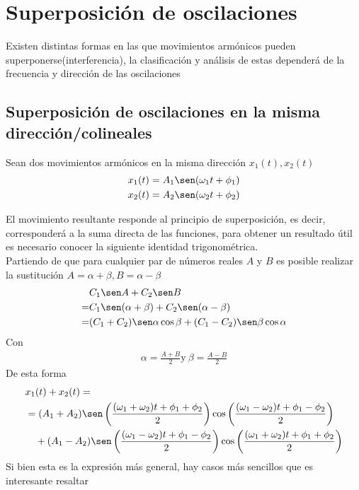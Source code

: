 \documentclass[12pt]{article}
\begin{document}
\section{Superposición de oscilaciones}
Existen distintas formas en las que movimientos armónicos pueden superponerse(interferencia), la clasificación y análisis de estas dependerá de la frecuencia y dirección de las oscilaciones

\subsection{Superposición de oscilaciones en la misma dirección/colineales } \label{subsec: superpocición de oscilaciones colineales}

Sean dos movimientos armónicos en la misma dirección \(x_1(t), x_2(t)\)
\begin{align*}
    x_1(t) = A_1\sen(\omega_1 t + \phi_1) \\
    x_2(t) = A_2\sen(\omega_2 t + \phi_2)
\end{align*}

El movimiento resultante responde al principio de superposición, es decir, corresponderá a la suma directa de las  funciones, para obtener un resultado útil es necesario conocer la siguiente identidad trigonométrica.\\

Partiendo de que para cualquier par de números reales \(A\) y \(B\) es posible realizar la sustitución \(A= \alpha + \beta,  B= \alpha - \beta\)
\begin{align*}
    &C_1\sen A + C_2\sen B \\
     =& C_1\sen(\alpha +\beta) + C_2\sen(\alpha-\beta)\\
    =&(C_1 + C_2)\sen\alpha\cos\beta +(C_1 - C_2)\sen\beta\cos\alpha
\end{align*}
Con
\begin{align*}
    \alpha = \frac{A+ B }{2} \text{y} \ \beta = \frac{A-B }{2}
\end{align*}
De esta forma
\begin{align*}
    &x_1(t) + x_2(t) =\\
    &=(A_1 + A_2)\sen\left(\frac{(\omega_1 + \omega_2)t + \phi_1 + \phi_2}{2}\right)\cos\left(\frac{(\omega_1 - \omega_2)t + \phi_1 - \phi_2}{2}\right)\\
     & \quad +(A_1 - A_2)\sen\left(\frac{(\omega_1 - \omega_2)t + \phi_1 - \phi_2}{2}\right)\cos\left(\frac{(\omega_1 + \omega_2)t + \phi_1 + \phi_2}{2}\right)
\end{align*}
Si bien esta es la expresión más general, hay casos más sencillos que es interesante resaltar
\end{document}

